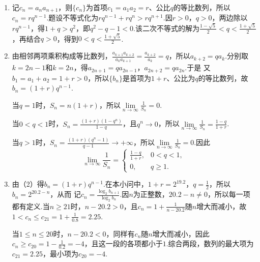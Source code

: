 \documentclass[UTF8,a4paper,oneside,11pt]{ctexbook}
\begin{document}
\begin{solution}
\begin{enumerate}
\item 记\(c_n=a_na_{n+1}\)，则\(\{c_n\}\)为首项\(c_1=a_1a_2=r\)、公比\(q\)的等比数列，所以\(c_n=rq^{n-1}\).题设不等式化为\(rq^{n-1}+rq^n>rq^{n+1}\).因\(r>0\)，\(q>0\)，两边除以\(rq^{n-1}\)，得\(1+q>q^2\)，即\(q^2-q-1<0\).该二次不等式的解为\(\frac{1-\sqrt5}{2}<q<\frac{1+\sqrt5}{2}\)，再结合\(q>0\)，得到\(0<q<\frac{1+\sqrt5}{2}\).

\item 由相邻两项乘积构成等比数列，\(\frac{a_{k+1}a_{k+2}}{a_ka_{k+1}}=\frac{a_{k+2}}{a_k}=q\)，所以\(a_{k+2}=qa_k\).分别取\(k=2n-1\)和\(k=2n\)，得\(a_{2n+1}=qa_{2n-1}\)，\(a_{2n+2}=qa_{2n}\).于是
又\(b_1=a_1+a_2=1+r>0\)，所以\(\{b_n\}\)是首项为\(1+r\)、公比为\(q\)的等比数列，故\(b_n=(1+r)q^{n-1}\).

当\(q=1\)时，\(S_n=n(1+r)\)，所以\(\lim\limits_{n\to\infty}\frac1{S_n}=0\).

当\(0<q<1\)时，\(S_n=\frac{(1+r)(1-q^n)}{1-q}\)，且\(q^n\to0\)，所以\(\lim\limits_{n\to\infty}\frac1{S_n}=\frac{1-q}{1+r}\).

当\(q>1\)时，\(S_n=\frac{(1+r)(q^n-1)}{q-1}\to+\infty\)，所以\(\lim\limits_{n\to\infty}\frac1{S_n}=0\).因此
\[
\lim\limits_{n \to \infty} \frac{1}{S_n}
=
\begin{cases}
\frac{1 - q}{1 + r}, & 0 < q < 1,\\
0, & q \geqslant 1.
\end{cases}
\]

\item 由（2）得\(b_n=(1+r)q^{n-1}\).在本小问中，\(1+r=2^{19.2}\)，\(q=\frac12\)，所以\(b_n=2^{20.2-n}\)，从而
记\(c_n=\frac{\log_2b_{n+1}}{\log_2b_n}\).因\(n\)为正整数，\(20.2-n\ne0\)，所以每一项都有定义.当\(n\geqslant21\)时，\(n-20.2>0\)，且\(c_n=1+\frac1{n-20.2}\)随\(n\)增大而减小，故\(1<c_n\leqslant c_{21}=1+\frac1{0.8}=2.25\).

当\(1\leqslant n\leqslant20\)时，\(n-20.2<0\)，同样有\(c_n\)随\(n\)增大而减小，因此\(c_n\geqslant c_{20}=1-\frac1{0.2}=-4\)，且这一段的各项都小于\(1\).综合两段，数列的最大项为\(c_{21}=2.25\)，最小项为\(c_{20}=-4\).
\end{enumerate}
\end{solution}

\end{document}
